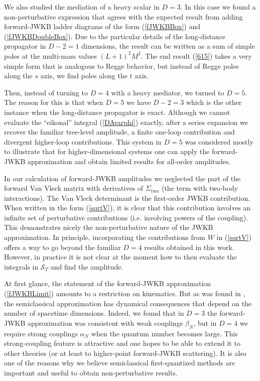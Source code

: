 We also studied the mediation of a heavy scalar in $D = 3$. In this case we found a non-perturbative expression that agrees with the expected result from adding forward-JWKB ladder diagrams of the form (\ref{fJWKBBox}) and (\ref{fJWKBDoubleBox}). Due to the particular details of the long-distance propagator in $D - 2 = 1$ dimensions, the result can be written as a sum of simple poles at the multi-mass values $(L+1)^{2}M^{2}$. The end result (\ref{615}) takes a very simple form that is analogous to Regge behavior, but instead of Regge poles along the $s$ axis, we find poles along the $t$ axis.

Then, instead of turning to $D = 4$ with a heavy mediator, we turned to $D = 5$. The reason for this is that when $D = 5$ we have $D - 2 = 3$ which is the other instance when the long-distance propagator is exact. Although we cannot evaluate the ``eikonal'' integral (\ref{DAvarphi}) exactly, after a series expansion we recover the familiar tree-level amplitude, a finite one-loop contribution and divergent higher-loop contributions. This system in $D = 5$ was considered mostly to illustrate that for higher-dimensional systems one can apply the forward-JWKB approximation and obtain limited results for all-order amplitudes.

In our calculation of forward-JWKB amplitudes we neglected the part of the forward Van Vleck matrix with derivatives of $\Sigma_{\text{two}}$ (the term with two-body interactions). The Van Vleck determinant is the first-order JWKB contribution. When written in the form (\ref{sqrtV}), it is clear that this contribution involves an infinite set of perturbative contributions (i.e. involving powers of the coupling). This demonstrates nicely the non-perturbative nature of the JWKB approximation. In principle, incorporating the contributions from $W$ in (\ref{sqrtV}) offers a way to go beyond the familiar $D = 4$ results obtained in this work. However, in practice it is not clear at the moment how to then evaluate the integrals in $\mathcal{S}_{T}$ and find the amplitude.

At first glance, the statement of the forward-JWKB approximation (\ref{fJWKBLimit}) amounts to a restriction on kinematics. But as was found in \cite{HalpernSiegel}, the semiclassical approximation has dynamical consequences that depend on the number of spacetime dimensions. Indeed, we found that in $D = 3$ the forward-JWKB approximation was consistent with weak couplings $\beta_{N}$, but in $D = 4$ we require strong couplings $\alpha_{N}$ when the quantum number becomes large. This strong-coupling feature is attractive and one hopes to be able to extend it to other theories (or at least to higher-point forward-JWKB scattering). It is also one of the reasons why we believe semiclassical first-quantized methods are important and useful to obtain non-perturbative results.